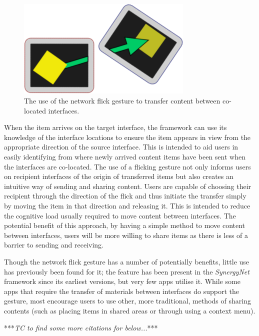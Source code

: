 \documentclass[a4paper,11pt]{article}
\begin{document}
\begin{figure}[h]
 \centering
   \includegraphics[width=0.75\textwidth]{figures/flickexample.png}
   \caption{The use of the network flick gesture to transfer content between co-located interfaces.}
   \label{fig:FlickExample}
\end{figure}

When the item arrives on the target interface, the framework can use its knowledge of the interface locations to ensure the item appears in view from the appropriate direction of the source interface.
This is intended to aid users in easily identifying from where newly arrived content items have been sent when the interfaces are co-located.
The use of a flicking gesture not only informs users on recipient interfaces of the origin of transferred items but also creates an intuitive way of sending and sharing content.
Users are capable of choosing their recipient through the direction of the flick and thus initiate the transfer simply by moving the item in that direction and releasing it.
This is intended to reduce the cognitive load usually required to move content between interfaces.
The potential benefit of this approach, by having a simple method to move content between interfaces, users will be more willing to share items as there is less of a barrier to sending and receiving.

Though the network flick gesture has a number of potentially benefits, little use has previously been found for it; the feature has been present in the {\emph{SynergyNet}} framework since its earliest versions, but very few apps utilise it.
While some apps that require the transfer of materials between interfaces do support the gesture, most encourage users to use other, more traditional, methods of sharing contents (such as placing items in shared areas or through using a context menu).

***{\emph{TC to find some more citations for below...}}***
\end{document}
